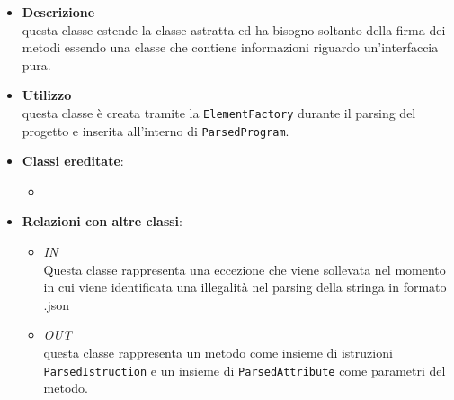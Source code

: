 \label{\nogloxy{swedesigner::server::project::ParsedInterface}}
\begin{itemize}
\item \textbf{Descrizione}\\
questa classe estende la classe astratta  ed ha bisogno soltanto della firma dei metodi essendo una classe che contiene informazioni riguardo un'interfaccia pura.
\item \textbf{Utilizzo}\\
questa classe è creata tramite la \texttt{ElementFactory} durante il parsing del progetto e inserita all'interno di \texttt{ParsedProgram}.
\item \textbf{Classi ereditate}:
\begin{itemize}
\item \hyperref[\nogloxy{swedesigner::server::project::ParsedType}]{}
\end{itemize}
\item \textbf{Relazioni con altre classi}:
\begin{itemize}
\item \textit{IN} \hyperref[\nogloxy{swedesigner::server::project::ParsedException}]{}\\
Questa classe rappresenta una eccezione che viene sollevata nel momento in cui viene identificata una illegalità nel parsing della stringa in formato .json
\item \textit{OUT} \hyperref[\nogloxy{swedesigner::server::project::ParsedMethod}]{}\\
questa classe rappresenta un metodo come insieme di istruzioni \texttt{ParsedIstruction} e un insieme di \texttt{ParsedAttribute} come parametri del metodo.
\end{itemize}
\end{itemize}

